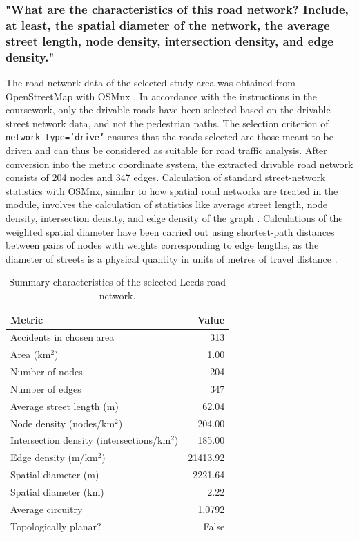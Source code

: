 \documentclass[acmsmall,nonacm,natbib=false]{acmart}
\begin{document}
\subsubsection{\large\textbf{{"What are the characteristics of this road network? Include, at least, the spatial diameter of the network, the average street length, node density, intersection density, and edge density."}}} 
\leavevmode \par \noindent
The road network data of the selected study area was obtained from OpenStreetMap with OSMnx \cite{boeing2017osmnx}. In accordance with the instructions in the coursework, only the drivable roads have been selected based on the drivable street network data, and not the pedestrian paths. The selection criterion of \texttt{network\_type='drive'} ensures that the roads selected are those meant to be driven and can thus be considered as suitable for road traffic analysis.
After conversion into the metric coordinate system, the extracted drivable road network consists of 204 nodes and 347 edges. Calculation of standard street-network statistics with OSMnx, similar to how spatial road networks are treated in the module, involves the calculation of statistics like average street length, node density, intersection density, and edge density of the graph \cite{boeing2017osmnx}. Calculations of the weighted spatial diameter have been carried out using shortest-path distances between pairs of nodes with weights corresponding to edge lengths, as the diameter of streets is a physical quantity in units of metres of travel distance \cite{okabe2000spatial}.
\begin{table}
    \centering
    \vspace{-10pt}
    \caption{Summary characteristics of the selected Leeds road network.}
    \label{tab:taskA_metrics}
    \begin{tabular}{lr}
    \toprule
    Metric & Value \\
    \midrule
    Accidents in chosen area & 313 \\
    Area (km$^2$) & 1.00 \\
    Number of nodes & 204 \\
    Number of edges & 347 \\
    Average street length (m) & 62.04 \\
    Node density (nodes/km$^2$) & 204.00 \\
    Intersection density (intersections/km$^2$) & 185.00 \\
    Edge density (m/km$^2$) & 21413.92 \\
    Spatial diameter (m) & 2221.64 \\
    Spatial diameter (km) & 2.22 \\
    Average circuitry & 1.0792 \\
    Topologically planar? & False \\
    \bottomrule
    \end{tabular}
    \vspace{-10pt}
\end{table}
\end{document}
